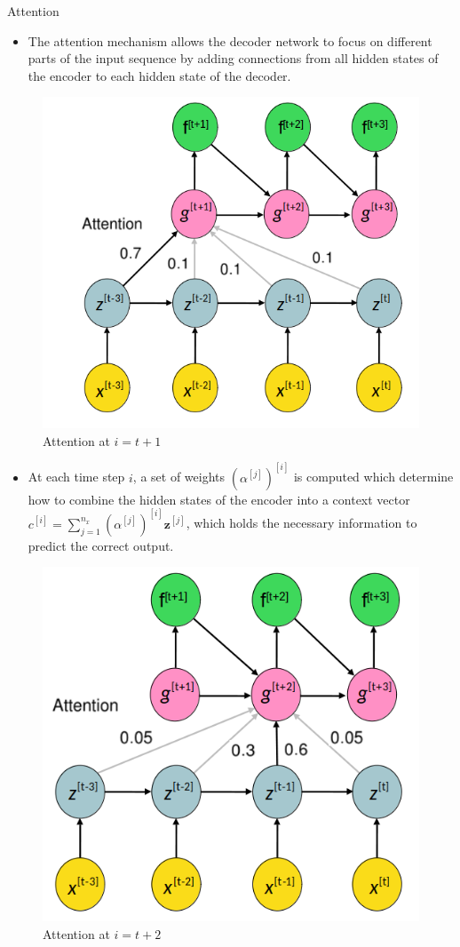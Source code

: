 \begin{vbframe}{Attention}
   \framebreak
   
   \begin{itemize}  
    \item The attention mechanism allows the decoder network to focus on different parts of the input sequence by adding connections from all hidden states of the encoder to each hidden state of the decoder.
  \end{itemize}
 \begin{figure}
    \includegraphics[width=4.cm]{figure/seq2seq_3.png}
    \caption{Attention at $i=t+1$}
  \end{figure}
 
\framebreak
\begin{itemize}  
    \item At each time step $i$, a set of weights $(\alpha^{[j]})^{[i]}$ is computed which determine how to combine the hidden states of the encoder into a context vector $c^{[i]}= \sum_{j=1}^{n_x} (\alpha^{[j]})^{[i]} \bm{z}^{[j]}$, which holds the necessary information to predict the correct output.
  \end{itemize}
  \begin{figure}
    \includegraphics[width=4.cm]{figure/seq2seq_4.png}
    \caption{Attention at $i=t+2$}
  \end{figure}
  

\end{vbframe}
